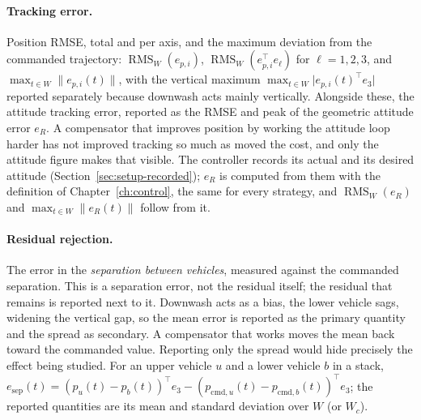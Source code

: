 \paragraph{Tracking error.} Position RMSE, total and per axis, and the maximum deviation from the
commanded trajectory: $\operatorname{RMS}_W(e_{p,i})$, $\operatorname{RMS}_W(e_{p,i}^\top e_\ell)$ for
$\ell = 1,2,3$, and $\max_{t\in W}\lVert e_{p,i}(t)\rVert$, with the vertical maximum
$\max_{t\in W} \lvert e_{p,i}(t)^\top e_3\rvert$ reported separately because downwash acts mainly
vertically. Alongside these, the attitude tracking error, reported as the RMSE and peak
of the geometric attitude error $e_R$. A compensator that improves position by working the attitude
loop harder has not improved tracking so much as moved the cost, and only the attitude figure makes
that visible.
The controller records its actual and its desired attitude (Section~\ref{sec:setup-recorded}); $e_R$
is computed from them with the definition of Chapter~\ref{ch:control}, the same for every strategy,
and $\operatorname{RMS}_W(e_R)$ and $\max_{t\in W}\lVert e_R(t)\rVert$ follow from it.

\paragraph{Residual rejection.} The error in the \emph{separation between vehicles}, measured
against the commanded separation. This is a separation error, not the residual itself; the residual
that remains is reported next to it. Downwash acts as a bias, the lower vehicle sags, widening the
vertical gap, so the mean error is reported as the primary quantity and the spread as secondary. A
compensator that works moves the mean back toward the commanded value. Reporting only the spread
would hide precisely the effect being studied.
For an upper vehicle $u$ and a lower vehicle $b$ in a stack,
$e_{\mathrm{sep}}(t) = (p_u(t) - p_b(t))^\top e_3 - (p_{\mathrm{cmd},u}(t) - p_{\mathrm{cmd},b}(t))^\top e_3$;
the reported quantities are its mean and standard deviation over $W$ (or $W_c$).

